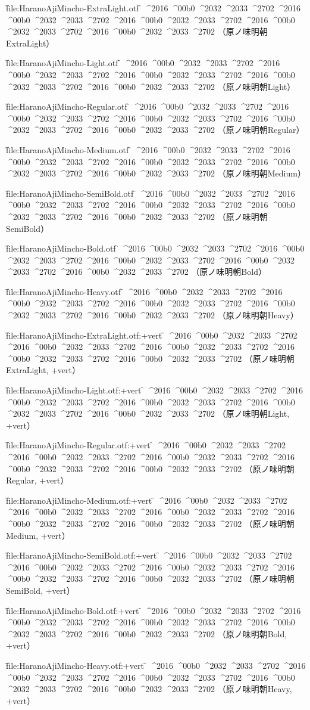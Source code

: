 

\nopagenumbers

\def\test{%
^^^^2016%
^^^^00b0%
^^^^2032%
^^^^2033%
^^^^2702}

\def\testAll{\test \test \test \test \test}


\font\f{file:HaranoAjiMincho-ExtraLight.otf} \f
\testAll
（原ノ味明朝ExtraLight）\par

\font\f{file:HaranoAjiMincho-Light.otf} \f
\testAll
（原ノ味明朝Light）\par

\font\f{file:HaranoAjiMincho-Regular.otf} \f
\testAll
（原ノ味明朝Regular）\par

\font\f{file:HaranoAjiMincho-Medium.otf} \f
\testAll
（原ノ味明朝Medium）\par

\font\f{file:HaranoAjiMincho-SemiBold.otf} \f
\testAll
（原ノ味明朝SemiBold）\par

\font\f{file:HaranoAjiMincho-Bold.otf} \f
\testAll
（原ノ味明朝Bold）\par

\font\f{file:HaranoAjiMincho-Heavy.otf} \f
\testAll
（原ノ味明朝Heavy）\par


\font\f{file:HaranoAjiMincho-ExtraLight.otf:+vert} \f
\testAll
（原ノ味明朝ExtraLight, +vert）\par

\font\f{file:HaranoAjiMincho-Light.otf:+vert} \f
\testAll
（原ノ味明朝Light, +vert）\par

\font\f{file:HaranoAjiMincho-Regular.otf:+vert} \f
\testAll
（原ノ味明朝Regular, +vert）\par

\font\f{file:HaranoAjiMincho-Medium.otf:+vert} \f
\testAll
（原ノ味明朝Medium, +vert）\par

\font\f{file:HaranoAjiMincho-SemiBold.otf:+vert} \f
\testAll
（原ノ味明朝SemiBold, +vert）\par

\font\f{file:HaranoAjiMincho-Bold.otf:+vert} \f
\testAll
（原ノ味明朝Bold, +vert）\par

\font\f{file:HaranoAjiMincho-Heavy.otf:+vert} \f
\testAll
（原ノ味明朝Heavy, +vert）\par


